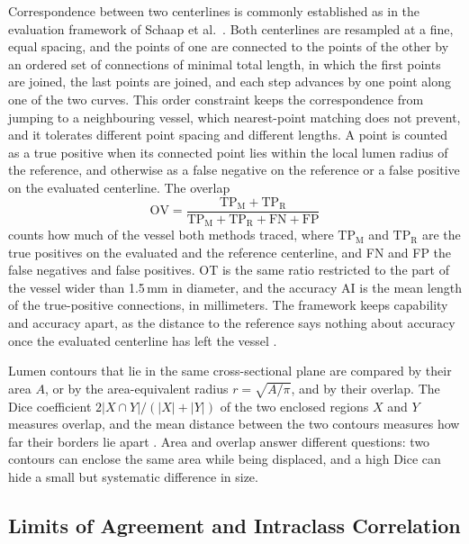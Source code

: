 Correspondence between two centerlines is commonly established as in the evaluation framework of Schaap et al.\ \cite{schaap2009cat08}.
Both centerlines are resampled at a fine, equal spacing, and the points of one are connected to the points of the other by an ordered set of connections of minimal total length, in which the first points are joined, the last points are joined, and each step advances by one point along one of the two curves.
This order constraint keeps the correspondence from jumping to a neighbouring vessel, which nearest-point matching does not prevent, and it tolerates different point spacing and different lengths.
A point is counted as a true positive when its connected point lies within the local lumen radius of the reference, and otherwise as a false negative on the reference or a false positive on the evaluated centerline.
The overlap
\begin{equation}
  \mathrm{OV} = \frac{\mathrm{TP_M} + \mathrm{TP_R}}{\mathrm{TP_M} + \mathrm{TP_R} + \mathrm{FN} + \mathrm{FP}}
  \label{eq:tech-ov}
\end{equation}
counts how much of the vessel both methods traced, where $\mathrm{TP_M}$ and $\mathrm{TP_R}$ are the true positives on the evaluated and the reference centerline, and FN and FP the false negatives and false positives.
OT is the same ratio restricted to the part of the vessel wider than 1.5\,mm in diameter, and the accuracy AI is the mean length of the true-positive connections, in millimeters.
The framework keeps capability and accuracy apart, as the distance to the reference says nothing about accuracy once the evaluated centerline has left the vessel \cite{schaap2009cat08}.

Lumen contours that lie in the same cross-sectional plane are compared by their area $A$, or by the area-equivalent radius $r = \sqrt{A/\pi}$, and by their overlap.
The Dice coefficient $2|X \cap Y| / (|X| + |Y|)$ of the two enclosed regions $X$ and $Y$ measures overlap, and the mean distance between the two contours measures how far their borders lie apart \cite{taha2015metrics}.
Area and overlap answer different questions: two contours can enclose the same area while being displaced, and a high Dice can hide a small but systematic difference in size.

\subsection{Limits of Agreement and Intraclass Correlation}
\label{sec:tech-agreement-loa}

